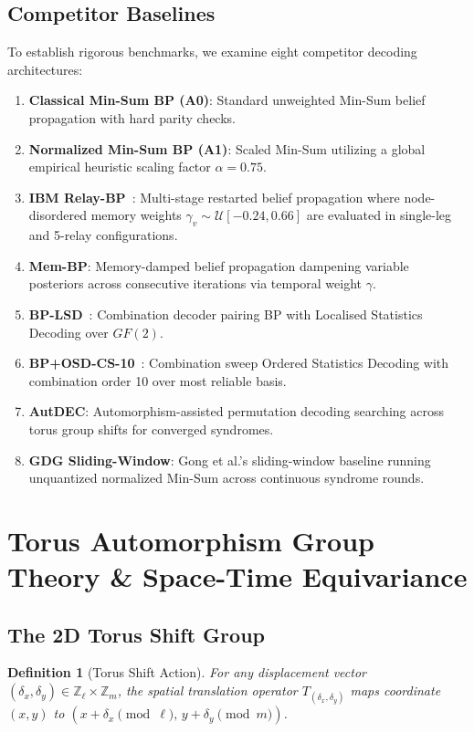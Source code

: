 \documentclass[journal]{IEEEtran}
\newtheorem{definition}{Definition}
\begin{document}
\subsection{Competitor Baselines}
To establish rigorous benchmarks, we examine eight competitor decoding architectures:
\begin{enumerate}
    \item \textbf{Classical Min-Sum BP (A0)}: Standard unweighted Min-Sum belief propagation with hard parity checks.
    \item \textbf{Normalized Min-Sum BP (A1)}: Scaled Min-Sum utilizing a global empirical heuristic scaling factor $\alpha = 0.75$.
    \item \textbf{IBM Relay-BP}~\cite{muller2025relay}: Multi-stage restarted belief propagation where node-disordered memory weights $\gamma_v \sim \mathcal{U}[-0.24, 0.66]$ are evaluated in single-leg and 5-relay configurations.
    \item \textbf{Mem-BP}: Memory-damped belief propagation dampening variable posteriors across consecutive iterations via temporal weight $\gamma$.
    \item \textbf{BP-LSD}~\cite{panteleev2021degenerate}: Combination decoder pairing BP with Localised Statistics Decoding over $GF(2)$.
    \item \textbf{BP+OSD-CS-10}~\cite{roffe2020decoding}: Combination sweep Ordered Statistics Decoding with combination order 10 over most reliable basis.
    \item \textbf{AutDEC}: Automorphism-assisted permutation decoding searching across torus group shifts for converged syndromes.
    \item \textbf{GDG Sliding-Window}: Gong et al.'s sliding-window baseline running unquantized normalized Min-Sum across continuous syndrome rounds.
\end{enumerate}

\section{Torus Automorphism Group Theory \& Space-Time Equivariance}

\subsection{The 2D Torus Shift Group}
\begin{definition}[Torus Shift Action]
For any displacement vector $(\delta_x, \delta_y) \in \mathbb{Z}_\ell \times \mathbb{Z}_m$, the spatial translation operator $T_{(\delta_x, \delta_y)}$ maps coordinate $(x, y)$ to $(x + \delta_x \pmod \ell, \, y + \delta_y \pmod m)$.
\end{definition}
\end{document}
